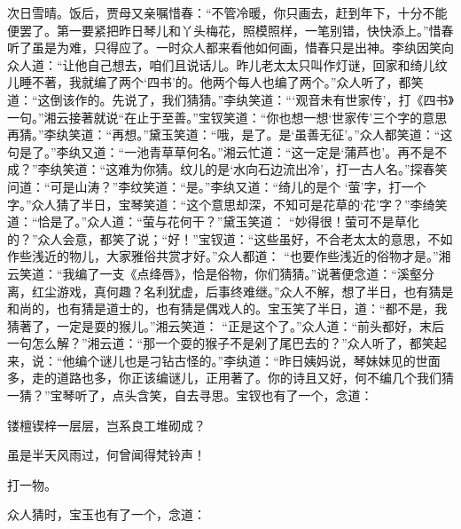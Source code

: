 \begin{parag}
    次日雪晴。饭后，贾母又亲嘱惜春：“不管冷暖，你只画去，赶到年下，十分不能便罢了。第一要紧把昨日琴儿和丫头梅花，照模照样，一笔别错，快快添上。”惜春听了虽是为难，只得应了。一时众人都来看他如何画，惜春只是出神。李纨因笑向众人道：“让他自己想去，咱们且说话儿。昨儿老太太只叫作灯谜，回家和绮儿纹儿睡不著，我就编了两个‘四书’的。他两个每人也编了两个。”众人听了，都笑道：“这倒该作的。先说了，我们猜猜。”李纨笑道：“‘观音未有世家传’，打《四书》一句。”湘云接著就说“在止于至善。”宝钗笑道：“你也想一想‘世家传’三个字的意思再猜。”李纨笑道：“再想。”黛玉笑道：“哦，是了。是‘虽善无征’。”众人都笑道：“这句是了。”李纨又道：“一池青草草何名。”湘云忙道：“这一定是‘蒲芦也’。再不是不成？”李纨笑道：“这难为你猜。纹儿的是‘水向石边流出冷’，打一古人名。”探春笑问道：“可是山涛？”李纹笑道：“是。”李纨又道：“绮儿的是个 ‘萤’字，打一个字。”众人猜了半日，宝琴笑道：“这个意思却深，不知可是花草的‘花’字？”李绮笑道：“恰是了。”众人道：“萤与花何干？”黛玉笑道： “妙得很！萤可不是草化的？”众人会意，都笑了说；“好！”宝钗道：“这些虽好，不合老太太的意思，不如作些浅近的物儿，大家雅俗共赏才好。”众人都道： “也要作些浅近的俗物才是。”湘云笑道：“我编了一支《点绛唇》，恰是俗物，你们猜猜。”说著便念道：“溪壑分离，红尘游戏，真何趣？名利犹虚，后事终难继。”众人不解，想了半日，也有猜是和尚的，也有猜是道士的，也有猜是偶戏人的。宝玉笑了半日，道：“都不是，我猜著了，一定是耍的猴儿。”湘云笑道： “正是这个了。”众人道：“前头都好，末后一句怎么解？”湘云道：“那一个耍的猴子不是剁了尾巴去的？”众人听了，都笑起来，说：“他编个谜儿也是刁钻古怪的。”李纨道：“昨日姨妈说，琴妹妹见的世面多，走的道路也多，你正该编谜儿，正用著了。你的诗且又好，何不编几个我们猜一猜？”宝琴听了，点头含笑，自去寻思。宝钗也有了一个，念道：
\end{parag}


\begin{poem}
    \begin{pl}

        镂檀锲梓一层层，岂系良工堆砌成？
    \end{pl}
    \begin{pl}

        虽是半天风雨过，何曾闻得梵铃声！
    \end{pl}

\end{poem}


\begin{parag}
    打一物。
\end{parag}


\begin{parag}
    众人猜时，宝玉也有了一个，念道：
\end{parag}


